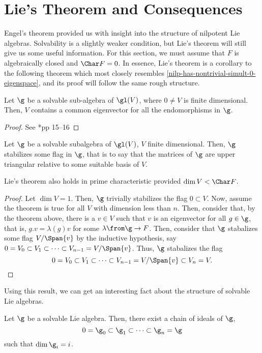 \documentclass[11pt,leqno,oneside]{amsart}
\numberwithin{thm}{section}
\begin{document}
\section{Lie's Theorem and Consequences}
Engel's theorem provided us with insight into the structure of
nilpotent Lie algebras. Solvability is a slightly weaker condition,
but Lie's theorem will still give us some useful information. For this
section, we must assume that \(F\) is algebraically closed and \(\Char
F = 0\). In essence, Lie's theorem is a corollary to the following
theorem which most closely resembles
\ref{nilp-has-nontrivial-simult-0-eigenspace}, and its proof will
follow the same rough structure.
\begin{thm}
  Let \(\g\) be a solvable sub-algebra of \(\gl(V)\), where \(0 \neq
  V\) is finite dimensional. Then, \(V\) contains a common eigenvector
  for all the endomorphisms in \(\g\). 
\end{thm}
\begin{proof}
  See \cite{humph}*{pp 15--16}
\end{proof}
\begin{cor}
  Let \(\g\) be a solvable subalgebra of \(\gl(V)\), \(V\) finite
  dimensional. Then, \(\g\) stabilizes some flag in \(\g\), that is to
  say that the matrices of \(\g\) are upper triangular relative to
  some suitable basis of \(V\). 
\end{cor}
\begin{rmk}
  Lie's theorem also holds in prime characteristic provided \(\dim V <
  \Char F\). 
\end{rmk}
\begin{proof}
  Let \(\dim V = 1\). Then, \(\g\) trivially stabilizes the flag \(0
  \subset V\). Now, assume the theorem is true for all \(V\) with
  dimension less than \(n\). Then, consider that, by the theorem
  above, there is a \(v \in V\) such that \(v\) is an eigenvector for
  all \(g \in \g\), that is, \(g.v = \lambda(g)v\) for some \(\lambda
  \from \g \to F\). Then, consider that \(\g\) stabalizes
  some flag \(V/\Span\{v\}\) by the inductive hypothesis, say \(0 = V_0
  \subset V_1
  \subset \cdots \subset V_{n-1} = V/\Span\{v\}\). Thus, \(\g\)
  stabalizes the flag \[
    0 = V_0 \subset V_1 \subset \cdots \subset V_{n-1} = V/\Span\{v\}
    \subset V_n = V.
  \]
\end{proof}
Using this result, we can get an interesting fact about the structure
of solvable Lie algebras.
\begin{cor}
  Let \(\g\) be a solvable Lie algebra. Then, there exist a chain of
  ideals of \(\g\), \[
    0 = \g_0 \subset \g_1 \subset \cdots \subset \g_n = \g
  \]
  such that \(\dim \g_i = i\). 
\end{cor}
\end{document}
